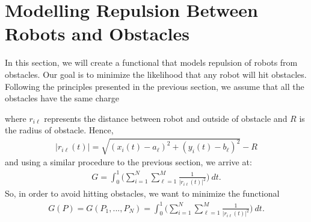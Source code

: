 \section{Modelling Repulsion Between Robots and Obstacles}

In this section, we will create a functional that models repulsion of robots from obstacles. Our goal is to minimize the likelihood that any robot will hit obstacles. Following the principles presented in the previous section, we assume that all the obstacles have the same charge
\begin{center}
\end{center}
where \( r_{i \ell} \) represents the distance between robot and outside of obstacle and \( R \) is the radius of obstacle. 
Hence, 
\begin{align*}
    |r_{i\ell}(t)| = \sqrt{(x_i(t) - a_{\ell})^2 + (y_i(t) - b_{\ell})^2} - R
\end{align*}
and using a similar procedure to the previous section, we arrive at:
\begin{align*}
    G = \int_{0}^{1} \bigg(  \sum_{i=1}^{N}\sum_{\ell=1}^{M} \frac{1}{|r_{i\ell}(t)|^2}        \bigg) \ dt.
\end{align*}
So, in order to avoid hitting obstacles, we want to minimize the functional
\begin{align*}
    G(P) = G(P_1,...,P_N) =  \int_{0}^{1} \bigg( \sum_{i=1}^{N}\sum_{\ell=1}^{M} \frac{1}{|r_{i\ell}(t)|^2} \bigg) \ dt.
\end{align*}

